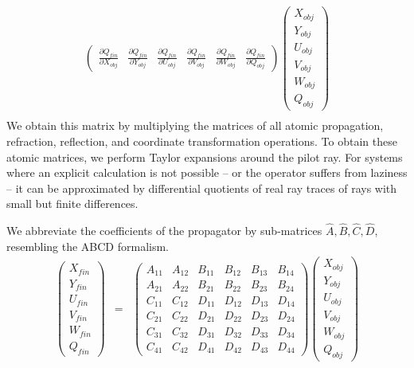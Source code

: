 \documentclass[12pt,a4paper,twoside,openright,BCOR10mm,headsepline,titlepage,abstracton,chapterprefix,final]{scrreprt}
\begin{document}
\begin{eqnarray}
\begin{pmatrix}
  \frac{\partial Q_{fin}}{\partial X_{obj}} & \frac{\partial Q_{fin}}{\partial Y_{obj}} & \frac{\partial Q_{fin}}{\partial U_{obj}} & \frac{\partial Q_{fin}}{\partial V_{obj}} & \frac{\partial Q_{fin}}{\partial W_{obj}} & \frac{\partial Q_{fin}}{\partial Q_{obj}}
 \end{pmatrix}
 \begin{pmatrix}
  X_{obj} \\[2ex] Y_{obj} \\[2ex] U_{obj} \\[2ex] V_{obj} \\[2ex] W_{obj} \\[2ex] Q_{obj} 
 \end{pmatrix} \nonumber \\
\end{eqnarray}
We obtain this matrix by multiplying the matrices of all atomic propagation, refraction, reflection, and coordinate transformation operations.
To obtain these atomic matrices, we perform Taylor expansions around the pilot ray.
For systems where an explicit calculation is not possible
-- or the operator suffers from laziness --
it can be approximated by differential quotients of real ray traces of rays with small but finite differences.

We abbreviate the coefficients of the propagator by sub-matrices $\hat{A}, \hat{B}, \hat{C}, \hat{D}$, 
resembling the ABCD formalism.
\begin{eqnarray}
 \begin{pmatrix}
  X_{fin} \\ Y_{fin} \\ U_{fin} \\ V_{fin} \\ W_{fin} \\ Q_{fin} 
 \end{pmatrix}
 &=&
 \begin{pmatrix}
  A_{11} & A_{12} & B_{11} & B_{12} & B_{13} & B_{14} \\
  A_{21} & A_{22} & B_{21} & B_{22} & B_{23} & B_{24} \\
  C_{11} & C_{12} & D_{11} & D_{12} & D_{13} & D_{14} \\
  C_{21} & C_{22} & D_{21} & D_{22} & D_{23} & D_{24} \\
  C_{31} & C_{32} & D_{31} & D_{32} & D_{33} & D_{34} \\
  C_{41} & C_{42} & D_{41} & D_{42} & D_{43} & D_{44}
 \end{pmatrix}
 \begin{pmatrix}
  X_{obj} \\ Y_{obj} \\ U_{obj} \\ V_{obj} \\ W_{obj} \\ Q_{obj} 
 \end{pmatrix}
\end{eqnarray}
\end{document}

